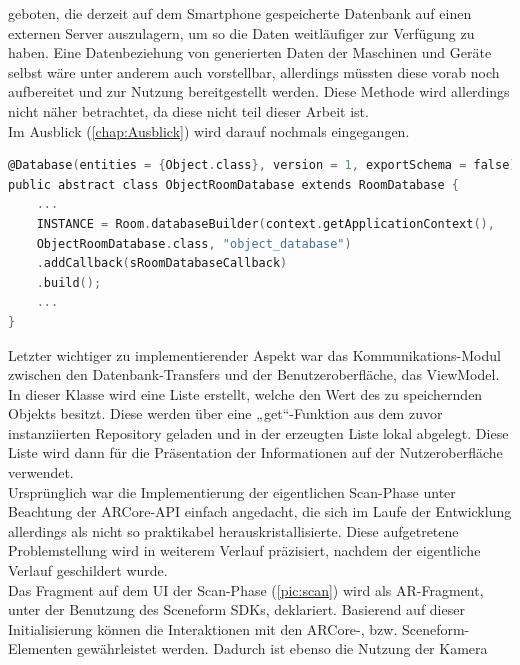 geboten, die derzeit auf dem Smartphone gespeicherte Datenbank auf einen externen Server auszulagern, um so die Daten weitläufiger zur Verfügung zu haben. 
Eine Datenbeziehung von generierten Daten der Maschinen und Geräte selbst wäre unter anderem auch vorstellbar, allerdings müssten diese vorab noch aufbereitet 
und zur Nutzung bereitgestellt werden. Diese Methode wird allerdings nicht näher betrachtet, da diese nicht teil dieser Arbeit ist. 
\\ 
Im Ausblick (\ref{chap:Ausblick}) wird darauf nochmals eingegangen.
\\ 
\linebreak
\begin{lstlisting}[language=C,
    frame=lines,           % Ein Rahmen um den Code (single for box, lines for top and bottom)
    xleftmargin=\parindent,  % Rahmen link von den Zahlen
    style=algoBericht,
    label={code:dblayer},
    captionpos=b,           % Caption unter den Code setzen
caption={Erzeugung des Datenbank-Layers „Room“}]
@Database(entities = {Object.class}, version = 1, exportSchema = false)
public abstract class ObjectRoomDatabase extends RoomDatabase {
    ...
    INSTANCE = Room.databaseBuilder(context.getApplicationContext(),
    ObjectRoomDatabase.class, "object_database")
    .addCallback(sRoomDatabaseCallback)
    .build();
    ...
}
\end{lstlisting}
Letzter wichtiger zu implementierender Aspekt war das Kommunikations-Modul zwischen den Datenbank-Transfers und der Benutzeroberfläche, das ViewModel. 
In dieser Klasse wird eine Liste erstellt, welche den Wert des zu speichernden Objekts besitzt. Diese werden über eine „get“-Funktion aus dem zuvor 
instanziierten Repository geladen und in der erzeugten Liste lokal abgelegt. Diese Liste wird dann für die Präsentation der Informationen auf der 
Nutzeroberfläche verwendet. 
\\ 
\linebreak
Ursprünglich war die Implementierung der eigentlichen Scan-Phase unter Beachtung der ARCore-\acs{API} einfach angedacht, die sich im Laufe der Entwicklung 
allerdings als nicht so praktikabel herauskristallisierte. Diese aufgetretene Problemstellung wird in weiterem Verlauf präzisiert, nachdem der eigentliche 
Verlauf geschildert wurde. 
\\ 
Das Fragment auf dem \acl{UI} der Scan-Phase (\ref{pic:scan}) wird als \acs{AR}-Fragment, unter der Benutzung des Sceneform \acs{SDK}s, deklariert. Basierend auf 
dieser Initialisierung können die Interaktionen mit den ARCore-, bzw. Sceneform- Elementen gewährleistet werden. Dadurch ist ebenso die Nutzung der Kamera 
